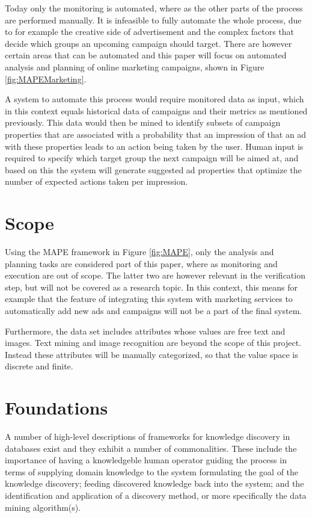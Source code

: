 \documentclass[a4paper]{article}
\begin{document}
Today only the monitoring is automated, where as the other parts of the process are performed manually. It is infeasible to fully automate the whole process, due to for example the creative side of advertisement and the complex factors that decide which groups an upcoming campaign should target. There are however certain areas that can be automated and this paper will focus on automated analysis and planning of online marketing campaigns, shown in Figure \ref{fig:MAPEMarketing}.

A system to automate this process would require monitored data as input, which in this context equals historical data of campaigns and their metrics as mentioned previously. This data would then be mined to identify subsets of campaign properties that are associated with a probability that an impression of that an ad with these properties leads to an action being taken by the user. Human input is required to specify which target group the next campaign will be aimed at, and based on this the system will generate suggested ad properties that optimize the number of expected actions taken per impression.

\section{Scope}
Using the MAPE framework in Figure \ref{fig:MAPE}, only the analysis and planning tasks are considered part of this paper, where as monitoring and execution are out of scope. The latter two are however relevant in the verification step, but will not be covered as a research topic. In this context, this means for example that the feature of integrating this system with marketing services to automatically add new ads and campaigns will not be a part of the final system.

Furthermore, the data set includes attributes whose values are free text and images. Text mining and image recognition are beyond the scope of this project. Instead these attributes will be manually categorized, so that the value space is discrete and finite.

\section{Foundations}
A number of high-level descriptions of frameworks for knowledge discovery in databases exist \citep{Fayyad1996, Frawley1992}
and they exhibit a number of commonalities. These include the importance of having a knowledgeble human operator guiding the process in terms of supplying domain knowledge to the system formulating the goal of the knowledge discovery; feeding discovered knowledge back into the system; and the identification and application of a discovery method, or more specifically the data mining algorithm(s).
\end{document}
